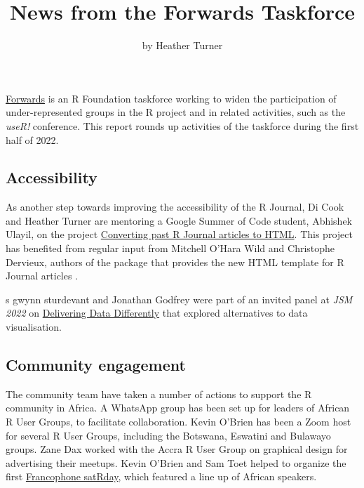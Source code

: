 \title{News from the Forwards Taskforce}
\author{by Heather Turner}

\maketitle


\href{https://forwards.github.io/}{Forwards} is an R Foundation
taskforce working to widen the participation of under-represented groups
in the R project and in related activities, such as the \emph{useR!}
conference. This report rounds up activities of the taskforce during the
first half of 2022.

\hypertarget{accessibility}{%
\subsection{Accessibility}\label{accessibility}}

As another step towards improving the accessibility of the R Journal, Di
Cook and Heather Turner are mentoring a Google Summer of Code student,
Abhishek Ulayil, on the project
\href{https://github.com/rstats-gsoc/gsoc2022/wiki/Converting-past-R-Journal-articles-to-HTML}{Converting
past R Journal articles to HTML}. This project has benefited from
regular input from Mitchell O'Hara Wild and Christophe Dervieux, authors
of the  package that provides the new HTML template for R
Journal articles \citep{rjtools}.

s gwynn sturdevant and Jonathan Godfrey were part of an invited panel at
\emph{JSM 2022} on
\href{https://ww2.amstat.org/meetings/jsm/2022/onlineprogram/AbstractDetails.cfm?abstractid=319247}{Delivering
Data Differently} that explored alternatives to data visualisation.

\hypertarget{community-engagement}{%
\subsection{Community engagement}\label{community-engagement}}

The community team have taken a number of actions to support the R
community in Africa. A WhatsApp group has been set up for leaders of
African R User Groups, to facilitate collaboration. Kevin O'Brien has
been a Zoom host for several R User Groups, including the Botswana,
Eswatini and Bulawayo groups. Zane Dax worked with the Accra R User
Group on graphical design for advertising their meetups. Kevin O'Brien
and Sam Toet helped to organize the first
\href{https://satrdays.org/blog/2022/07/20/2022-francophone/}{Francophone
satRday}, which featured a line up of African speakers.


